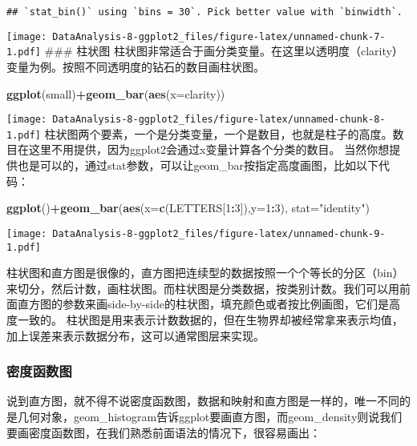 \documentclass[]{article}
\newenvironment{Shaded}{\begin{snugshade}}{\end{snugshade}}
\newcommand{\KeywordTok}[1]{\textcolor[rgb]{0.13,0.29,0.53}{\textbf{#1}}}
\newcommand{\DataTypeTok}[1]{\textcolor[rgb]{0.13,0.29,0.53}{#1}}
\newcommand{\DecValTok}[1]{\textcolor[rgb]{0.00,0.00,0.81}{#1}}
\newcommand{\StringTok}[1]{\textcolor[rgb]{0.31,0.60,0.02}{#1}}
\newcommand{\OperatorTok}[1]{\textcolor[rgb]{0.81,0.36,0.00}{\textbf{#1}}}
\newcommand{\NormalTok}[1]{#1}
\begin{document}
\begin{verbatim}
## `stat_bin()` using `bins = 30`. Pick better value with `binwidth`.
\end{verbatim}

\texttt{[image: DataAnalysis-8-ggplot2\_files/figure-latex/unnamed-chunk-7-1.pdf]}
\#\#\# 柱状图
柱状图非常适合于画分类变量。在这里以透明度（clarity）变量为例。按照不同透明度的钻石的数目画柱状图。

\begin{Shaded}
\begin{Highlighting}[]
\KeywordTok{ggplot}\NormalTok{(small)}\OperatorTok{+}\KeywordTok{geom_bar}\NormalTok{(}\KeywordTok{aes}\NormalTok{(}\DataTypeTok{x=}\NormalTok{clarity))}
\end{Highlighting}
\end{Shaded}

\texttt{[image: DataAnalysis-8-ggplot2\_files/figure-latex/unnamed-chunk-8-1.pdf]}
柱状图两个要素，一个是分类变量，一个是数目，也就是柱子的高度。数目在这里不用提供，因为ggplot2会通过x变量计算各个分类的数目。
当然你想提供也是可以的，通过stat参数，可以让geom\_bar按指定高度画图，比如以下代码：

\begin{Shaded}
\begin{Highlighting}[]
\KeywordTok{ggplot}\NormalTok{()}\OperatorTok{+}\KeywordTok{geom_bar}\NormalTok{(}\KeywordTok{aes}\NormalTok{(}\DataTypeTok{x=}\KeywordTok{c}\NormalTok{(LETTERS[}\DecValTok{1}\OperatorTok{:}\DecValTok{3}\NormalTok{]),}\DataTypeTok{y=}\DecValTok{1}\OperatorTok{:}\DecValTok{3}\NormalTok{), }\DataTypeTok{stat=}\StringTok{"identity"}\NormalTok{)}
\end{Highlighting}
\end{Shaded}

\texttt{[image: DataAnalysis-8-ggplot2\_files/figure-latex/unnamed-chunk-9-1.pdf]}

柱状图和直方图是很像的，直方图把连续型的数据按照一个个等长的分区（bin）来切分，然后计数，画柱状图。而柱状图是分类数据，按类别计数。我们可以用前面直方图的参数来画side-by-side的柱状图，填充颜色或者按比例画图，它们是高度一致的。
柱状图是用来表示计数数据的，但在生物界却被经常拿来表示均值，加上误差来表示数据分布，这可以通常图层来实现。

\subsubsection{密度函数图}

说到直方图，就不得不说密度函数图，数据和映射和直方图是一样的，唯一不同的是几何对象，geom\_histogram告诉ggplot要画直方图，而geom\_density则说我们要画密度函数图，在我们熟悉前面语法的情况下，很容易画出：
\end{document}
